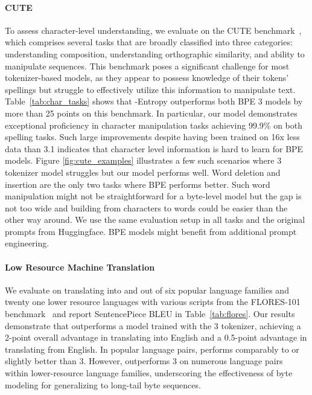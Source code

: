 \documentclass[]{fairmeta}
\begin{document}


\paragraph{CUTE}
To assess character-level understanding, we evaluate \model{} on the CUTE benchmark~\citep{edman2024cute}, which comprises several tasks that are broadly classified into three categories: understanding composition, understanding orthographic similarity, and ability to manipulate sequences. This benchmark poses a significant challenge for most tokenizer-based models, as they appear to possess knowledge of their tokens' spellings but struggle to effectively utilize this information to manipulate text. Table~\ref{tab:char_tasks} shows that \model{}-Entropy outperforms both BPE \llama{} 3 models by more than 25 points on this benchmark. In particular, our model demonstrates exceptional proficiency in character manipulation tasks achieving 99.9\% on both spelling tasks. Such large improvements despite \model{} having been trained on 16x less data than \llama{} 3.1 indicates that character level information is hard to learn for BPE models.
Figure \ref{fig:cute_examples} illustrates a few such scenarios where \llama{} 3 tokenizer model struggles but our \model{} model performs well. 
Word deletion and insertion are the only two tasks where BPE performs better. Such word manipulation might not be straightforward for a byte-level model but the gap is not too wide and building from characters to words could be easier than the other way around. We use the same evaluation setup in all tasks and the original prompts from Huggingface. BPE models might benefit from additional prompt engineering.


\paragraph{Low Resource Machine Translation} We evaluate \model{} on translating into and out of six popular language families and twenty one lower resource languages with various scripts from the FLORES-101 benchmark~\citep{goyal2022flores} and report SentencePiece BLEU in Table~\ref{tab:flores}.
Our results demonstrate that \model{} outperforms a model trained with the \llama{} 3 tokenizer, achieving a 2-point overall advantage in translating into English and a 0.5-point advantage in translating from English. In popular language pairs, \model{} performs comparably to or slightly better than \llama{} 3. However, \model{} outperforms \llama{} 3 on numerous language pairs within lower-resource language families, underscoring the effectiveness of byte modeling for generalizing to long-tail byte sequences.
\end{document}
